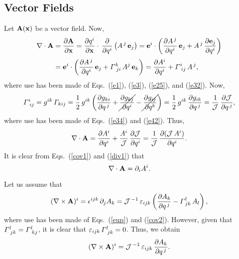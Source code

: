 \documentclass[12pt,prb,aps,notitlepage]{revtex4-1}
\begin{document}
\subsection{Vector Fields}
Let ${\bf A}({\bf x})$ be a vector field. Now,
\begin{align}\label{div1}
\nabla\cdot{\bf A}& = \frac{\partial {\bf A}}{\partial {\bf x}} = \frac{\partial q^i}{\partial{\bf x}}\cdot\,\frac{\partial}{\partial q^i}\left(A^{\,j}\,{\bf e}_j\right)
= {\bf e}^i\cdot\left(\frac{\partial A^{\,j}}{\partial q^i}\,{\bf e}_j + A^{\,j}\,\frac{\partial {\bf e}_j}{\partial q^i}\right)\nonumber\\[0.5ex]
&= {\bf e}^i\cdot\left(\frac{\partial A^{\,j}}{\partial q^i}\,{\bf e}_j + {\mit\Gamma}^k_{\,\,ji}\,A^j\,{\bf e}_k\right)= \frac{\partial A^i}{\partial q^i} + 
{\mit\Gamma}^i_{\,\,ij}\,A^{\,j},
\end{align}
where use has been made of Eqs.~(\ref{e1}), (\ref{e3}),  (\ref{e25}), and (\ref{e32}). 
Now,
\begin{equation}
{\mit\Gamma}^i_{\,\,ij} = g^{ik}\,{\mit\Gamma}_{kij} = \frac{1}{2}\,g^{ik}\left(\frac{\partial g_{ki}}{\partial q^{\,j}}+\cancel{\frac{\partial g_{kj}}{\partial q^i}}-
\cancel{\frac{\partial g_{ij}}{\partial q^k}}\right)= \frac{1}{2}\,g^{ik}\,\frac{\partial g_{ik}}{\partial q^{\,j}} = \frac{1}{\cal J}\,\frac{\partial{\cal J}}{\partial q^{\,j}},
\end{equation}
where use has been made of Eqs.~(\ref{e34}) and (\ref{e42}). Thus,
\begin{equation}
\nabla\cdot{\bf A} = \frac{\partial A^i}{\partial q^i} + \frac{A^i}{\cal J}\,\frac{\partial {\cal J}}{\partial q^i} = \frac{1}{\cal J}\,\frac{\partial ({\cal J}\,A^i)}{\partial q^i}.
\end{equation}
It is clear from Eqs.~(\ref{cov1}) and (\ref{div1}) that
\begin{equation}
\nabla\cdot{\bf A} = \partial_i A^i.
\end{equation}

Let us assume that
\begin{equation}
(\nabla\times{\bf A})^i = \epsilon^{ijk}\,\partial_j A_k ={\cal J}^{\,-1}\,\varepsilon_{ijk}\left(\frac{\partial A_k}{\partial q^{\,j}} - {\mit\Gamma}^l_{\,jk}\,A_l\right),
\end{equation}
where use has been made of Eqs.~(\ref{eup}) and (\ref{cov2}). However, given that ${\mit\Gamma}^l_{\,\,jk}={\mit\Gamma}^l_{\,\,kj}$, it
is clear that $\varepsilon_{ijk}\,{\mit\Gamma}^l_{\,\,jk} =0$. Thus, we obtain
\begin{equation}\label{ecurl}
(\nabla\times{\bf A})^i = {\cal J}^{\,-1}\,\varepsilon_{ijk}\,\frac{\partial A_k}{\partial q^{\,j}}. 
\end{equation}
 
\end{document}
